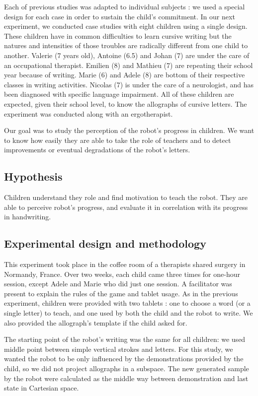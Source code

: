 \documentclass{sig-alternate}
\begin{document}
Each of previous studies was adapted to individual subjects : we used a special
design for each case in order to sustain the child's commitment.
In our next experiment, we conducted case studies with eight children using a single design. These children have in common difficulties to learn
cursive writing but the natures and intensities of those troubles are radically
different from one child to another. Valerie (7 years old), Antoine (6.5) and
Johan (7) are under the care of an
occupational therapist. Emilien (8) and Mathieu (7) are repeating their school year
because of writing. Marie (6) and Adele (8) are bottom of their respective
classes in writing activities. Nicolas (7) is under the care of a neurologist, and
has been diagnosed with specific language impairment. All of these children are
expected, given their school level, to know the allographs of
cursive letters. The experiment was conducted along with an ergotherapist. 

Our goal was to study the perception of the robot's progress in children. We want to know how easily they are able to take the role of teachers and to detect improvements or eventual degradations of the robot's letters. 


\subsection{Hypothesis}

Children understand they role and find motivation to teach the robot. They are able to perceive robot's progress, and evaluate it in correlation with its progress in handwriting.

\subsection{Experimental design and methodology}

This experiment took place in the coffee room of a therapists shared surgery
in Normandy, France. Over two weeks, each child came three times for one-hour
session, except Adele and Marie who did just one session. A facilitator was present to explain the rules of the game and tablet usage. As in the previous experiment, children were provided with two tablets : one to choose a word (or a single letter) to teach, and one
used by both the child and the robot to write. We also provided the allograph's template if the child asked for. 

The starting point of the robot's writing was the same for all children: we
used middle point between simple vertical strokes and letters. For this study,
we wanted the robot to be only influenced by the demonstrations provided by the
child, so we did not project allographs in a subspace. The new generated
sample by the robot were calculated as the middle way between demonstration and
last state in Cartesian space. 
\end{document}
